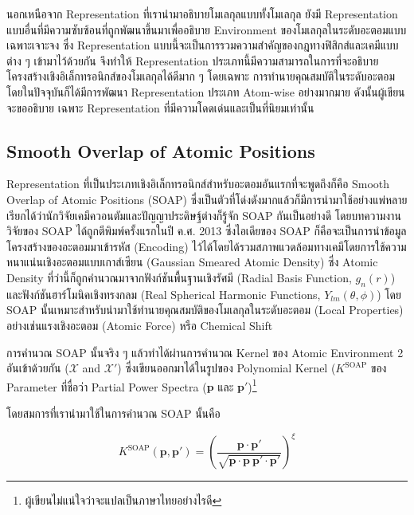 นอกเหนือจาก Representation ที่เรานำมาอธิบายโมเลกุลแบบทั้งโมเลกุล ยังมี Representation แบบอื่นที่มีความซับซ้อนที่ถูกพัฒนาขึ้นมาเพื่ออธิบาย
Environment ของโมเลกุลในระดับอะตอมแบบเฉพาะเจาะจง ซึ่ง Representation แบบนี้จะเป็นการรวมความสำคัญของกฎทางฟิสิกส์และเคมีแบบต่าง ๆ 
เข้ามาไว้ด้วยกัน จึงทำให้ Representation ประเภทนี้มีความสามารถในการที่จะอธิบายโครงสร้างเชิงอิเล็กทรอนิกส์ของโมเลกุลได้ดีมาก ๆ โดยเฉพาะ%
การทำนายคุณสมบัติในระดับอะตอม โดยในปัจจุบันก็ได้มีการพัฒนา Representation ประเภท Atom-wise อย่างมากมาย ดังนั้นผู้เขียนจะขออธิบาย%
เฉพาะ Representation ที่มีความโดดเด่นและเป็นที่นิยมเท่านั้น

\subsection{Smooth Overlap of Atomic Positions}
\label{ssec:soap}

Representation ที่เป็นประเภทเชิงอิเล็กทรอนิกส์สำหรับอะตอมอันแรกที่จะพูดถึงก็คือ Smooth Overlap of Atomic Positions (SOAP) 
ซึ่งเป็นตัวที่โด่งดังมากแล้วก็มีการนำมาใช้อย่างแพ่หลาย เรียกได้ว่านักวิจัยเคมีควอนตัมและปัญญาประดิษฐ์ต่างก็รู้จัก SOAP กันเป็นอย่างดี
โดยบทความงานวิจัยของ SOAP ได้ถูกตีพิมพ์ครั้งแรกในปี ค.ศ. 2013 ซึ่งไอเดียของ SOAP ก็คือจะเป็นการนำข้อมูลโครงสร้างของอะตอมมาเข้ารหัส 
(Encoding) ไว้ได้โดยได้รวมสภาพแวดล้อมทางเคมีโดยการใช้ความหนาแน่นเชิงอะตอมแบบเกาส์เซียน (Gaussian Smeared Atomic Density) 
ซึ่ง Atomic Density ที่ว่านี้ก็ถูกคำนวณมาจากฟังก์ชันพื้นฐานเชิงรัศมี (Radial Basis Function, $g_{n}(r)$) และฟังก์ชันฮาร์โมนิคเชิงทรงกลม 
(Real Spherical Harmonic Functions, $Y_{lm}(\theta, \phi)$)\autocite{bartok2013,de2016}
โดย SOAP นั้นเหมาะสำหรับนำมาใช้ทำนายคุณสมบัติของโมเลกุลในระดับอะตอม (Local Properties) อย่างเช่นแรงเชิงอะตอม (Atomic Force) 
หรือ Chemical Shift

การคำนวณ SOAP นั้นจริง ๆ แล้วทำได้ผ่านการคำนวณ Kernel ของ Atomic Environment 2 อันเข้าด้วยกัน ($\mathcal{X}$ and $\mathcal{X}'$)
ซึ่งเขียนออกมาได้ในรูปของ Polynomial Kernel ($K^\mathrm{SOAP}$ ของ Parameter ที่ชื่อว่า Partial Power Spectra 
($\mathbf{p}$ และ $\mathbf{p}'$)\footnote{ผู้เขียนไม่แน่ใจว่าจะแปลเป็นภาษาไทยอย่างไรดี} 

โดยสมการที่เรานำมาใช้ในการคำนวณ SOAP นั้นคือ

\begin{equation}
    K^\mathrm{SOAP}(\mathbf{p}, \mathbf{p'}) = \left( \frac{\mathbf{p} \cdot \mathbf{p'}}{\sqrt{\mathbf{p} 
    \cdot \mathbf{p}~\mathbf{p'} \cdot \mathbf{p'}}}\right)^{\xi}
\end{equation}

